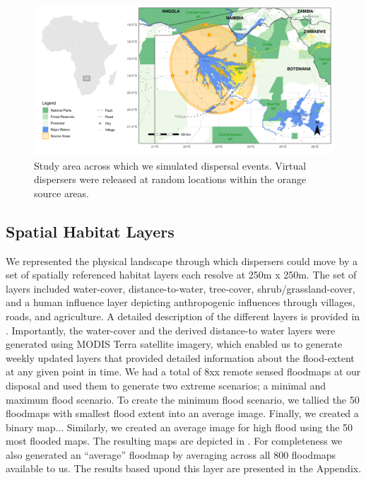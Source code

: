 \documentclass[abstract=on,10pt,a4paper,bibliography=totocnumbered]{article}
\begin{document}
\begin{figure}
  \begin{center}
  \includegraphics[width = \textwidth]{99_StudyArea.png}
  \caption{Study area across which we simulated dispersal events. Virtual
  dispersers were released at random locations within the orange source areas.}
  \label{StudyArea}
  \end{center}
\end{figure}

\subsection{Spatial Habitat Layers}
We represented the physical landscape through which dispersers could move by a
set of spatially referenced habitat layers each resolve at 250m x 250m. The set
of layers included water-cover, distance-to-water, tree-cover,
shrub/grassland-cover, and a human influence layer depicting anthropogenic
influences through villages, roads, and agriculture. A detailed description of
the different layers is provided in . Importantly, the
water-cover and the derived distance-to water layers were generated using MODIS
Terra satellite imagery, which enabled us to generate weekly updated layers that
provided detailed information about the flood-extent at any given point in time.
We had a total of 8xx remote sensed floodmaps at our disposal and used them to
generate two extreme scenarios; a minimal and maximum flood scenario. To create
the minimum flood scenario, we tallied the 50 floodmaps with smallest flood
extent into an average image. Finally, we created a binary map... Similarly, we
created an average image for high flood using the 50 most flooded maps. The
resulting maps are depicted in . For completeness we also
generated an  ``average'' floodmap by averaging across all 800 floodmaps
available to us. The results based upond this layer are presented in the
Appendix.
\end{document}
